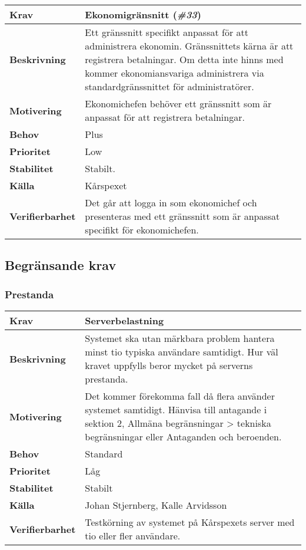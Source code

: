 \documentclass[a4paper, twoside, 11pt, titlepage]{article}
\begin{document}
	\begin{tabular} { p{2.6cm} p{12.5cm} }
		\hline
		\sffamily\textbf{Krav} & Ekonomigränsnitt (\emph{\#33})  \\
		\hline
		\sffamily\textbf{Beskrivning} & Ett gränssnitt specifikt anpassat för att administrera ekonomin. Gränssnittets kärna är att registrera betalningar. Om detta inte hinns med kommer ekonomiansvariga administrera via standardgränssnittet för administratörer.  \\
		\hline
		\sffamily\textbf{Motivering} & Ekonomichefen behöver ett gränssnitt som är anpassat för att registrera betalningar.  \\
		\hline
		\sffamily\textbf{Behov} & Plus  \\
		\hline
		\sffamily\textbf{Prioritet} & Low  \\
		\hline
		\sffamily\textbf{Stabilitet} & Stabilt.  \\
		\hline
		\sffamily\textbf{Källa} & Kårspexet  \\
		\hline
		\sffamily\textbf{Verifierbarhet} & Det går att logga in som ekonomichef och presenteras med ett gränssnitt som är anpassat specifikt för ekonomichefen.  \\
		\hline
	\end{tabular}


	\subsection{Begränsande krav}



		\subsubsection{Prestanda}


		\begin{tabular} { p{2.6cm} p{12.5cm} }
			\hline
			\sffamily\textbf{Krav} & Serverbelastning  \\
			\hline
			\sffamily\textbf{Beskrivning} & Systemet ska utan märkbara problem hantera minst tio typiska användare samtidigt. Hur väl kravet uppfylls beror mycket på serverns prestanda.  \\
			\hline
			\sffamily\textbf{Motivering} & Det kommer förekomma fall då flera använder systemet samtidigt. Hänvisa till antagande i sektion 2, Allmäna begränsningar > tekniska begränsningar eller Antaganden och beroenden.  \\
			\hline
			\sffamily\textbf{Behov} & Standard  \\
			\hline
			\sffamily\textbf{Prioritet} & Låg  \\
			\hline
			\sffamily\textbf{Stabilitet} & Stabilt  \\
			\hline
			\sffamily\textbf{Källa} & Johan Stjernberg, Kalle Arvidsson  \\
			\hline
			\sffamily\textbf{Verifierbarhet} & Testkörning av systemet på Kårspexets server med tio eller fler användare.  \\
			\hline
		\end{tabular}
		\vspace{6mm}
\end{document}
